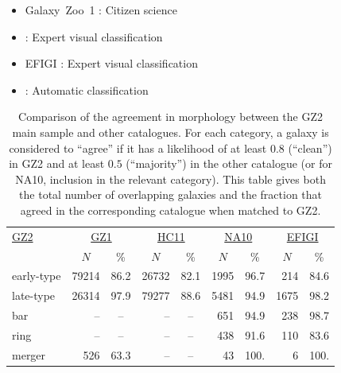 \documentclass[useAMS,usenatbib]{mn2e}
\begin{document}
\begin{itemize}
	\item Galaxy~Zoo~1 \citep{lin11}: Citizen science
	\item \citet{nai10} : Expert visual classification
	\item EFIGI \citep{bai11} : Expert visual classification
	\item \citet{hue11} : Automatic classification
\end{itemize}

\begin{table}
\centering
 \begin{tabular}{@{}lrcrcrcrc}
 \hline
\multicolumn{1}{l}{\underline{GZ2}} &
\multicolumn{2}{c}{\underline{GZ1}} &
\multicolumn{2}{c}{\underline{HC11}} &
\multicolumn{2}{c}{\underline{NA10}} &
\multicolumn{2}{c}{\underline{EFIGI}}
\\ 
\multicolumn{1}{l}{} &
\multicolumn{1}{c}{$N$} &
\multicolumn{1}{c}{\%} &
\multicolumn{1}{c}{$N$} &
\multicolumn{1}{c}{\%} &
\multicolumn{1}{c}{$N$} &
\multicolumn{1}{c}{\%} &
\multicolumn{1}{c}{$N$} &
\multicolumn{1}{c}{\%}
\\ 
\hline					
early-type     & 79214    & 86.2     & 26732    & 82.1   & 1995    & 96.7    & 214     & 84.6       \\
late-type      & 26314    & 97.9     & 79277    & 88.6   & 5481    & 94.9    & 1675    & 98.2       \\
bar            & --       &  --      & --       &  --    & 651     & 94.9    & 238     & 98.7       \\
ring           & --       &  --      & --       &  --    & 438     & 91.6    & 110     & 83.6       \\
merger         & 526      & 63.3     & --       &  --    & 43      & 100.    & 6       & 100.       \\
\hline
 \end{tabular}
 \caption{Comparison of the agreement in morphology between the GZ2 main sample and other catalogues. For each category, a galaxy is considered to ``agree'' if it has a likelihood of at least $0.8$ (``clean'') in GZ2 and at least $0.5$ (``majority'') in the other catalogue (or for NA10, inclusion in the relevant category). This table gives both the total number of overlapping galaxies and the fraction that agreed in the corresponding catalogue when matched to GZ2. \label{tbl-compare}}
\end{table}
\end{document}
